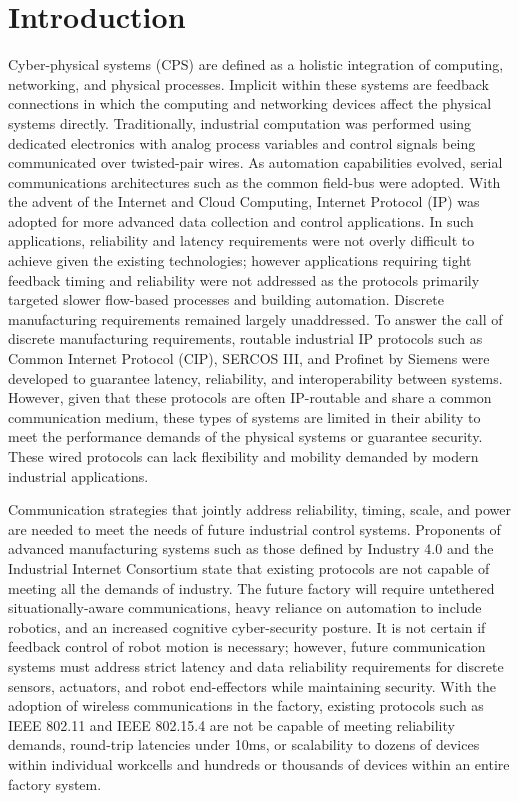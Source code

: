 \chapter{Introduction}\label{chapter:intro}

\chapterintro*
Cyber-physical systems (CPS) are defined as a holistic integration of computing, networking, and physical processes.  Implicit within these systems are feedback connections in which the computing and networking devices affect the physical systems directly.  Traditionally, industrial computation was performed using dedicated electronics with analog process variables and control signals being communicated over twisted-pair wires.  As automation capabilities evolved, serial communications architectures such as the common field-bus were adopted.  With the advent of the Internet and Cloud Computing, Internet Protocol (IP) was adopted for more advanced data collection and control applications.  In such applications, reliability and latency requirements were not overly difficult to achieve given the existing technologies; however applications requiring tight feedback timing and reliability were not addressed as the protocols primarily targeted slower flow-based processes and building automation.  Discrete manufacturing requirements remained largely unaddressed.  To answer the call of discrete manufacturing requirements, routable industrial IP protocols such as Common Internet Protocol (CIP), SERCOS III, and Profinet by Siemens were developed to guarantee latency, reliability, and interoperability between systems.  However, given that these protocols are often IP-routable and share a common communication medium, these types of systems are limited in their ability to meet the performance demands of the physical systems or guarantee security.   These wired protocols can lack flexibility and mobility demanded by modern industrial applications.

Communication strategies that jointly address reliability, timing, scale, and power are needed to meet the needs of future industrial control systems.  Proponents of advanced manufacturing systems such as those defined by Industry 4.0 and the Industrial Internet Consortium state that existing protocols are not capable of meeting all the demands of industry.  The future factory will require untethered situationally-aware communications, heavy reliance on automation to include robotics, and an increased cognitive cyber-security posture.  It is not certain if feedback control of robot motion is necessary; however, future communication systems must address strict latency and data reliability requirements for discrete sensors, actuators, and robot end-effectors while maintaining security.  With the adoption of wireless communications in the factory, existing protocols such as IEEE 802.11 and IEEE 802.15.4 are not be capable of meeting reliability demands, round-trip latencies under 10ms, or scalability to dozens of devices within individual workcells and hundreds or thousands of devices within an entire factory system.    

